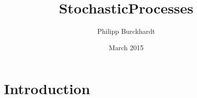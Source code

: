\documentclass{article}
\title{StochasticProcesses}
\author{Philipp Burckhardt}
\date{March 2015}
\begin{document}
\maketitle

\section{Introduction}
\end{document}

